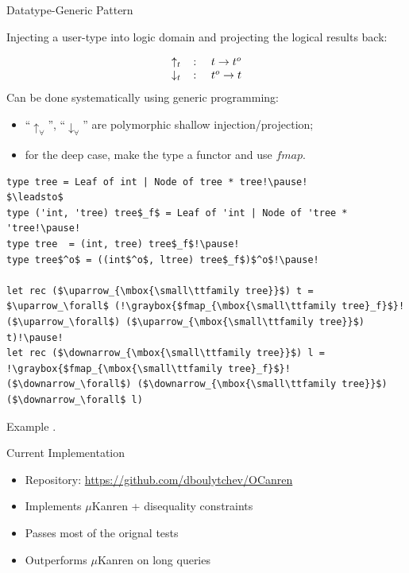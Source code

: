 \documentclass[10pt, mathserif]{beamer}
\let\\\tabularnewline
\let\\\tabularnewline
\newcommand{\oo}[1]{{#1}^o}
\newcommand{\graybox}[1]{\colorbox{light-gray}{#1}}
\theoremstyle{definition}
\begin{document}
\begin{frame}[fragile]{Datatype-Generic Pattern}

\small
Injecting a user-type into logic domain and projecting the
logical results back:

$$
\begin{array}{rcl}
\uparrow_t&\colon &t \to \oo{t}\\
\downarrow_t&\colon& \oo{t} \to t
\end{array}
$$
\pause
Can be done systematically using generic programming:

\begin{itemize}
\item ``$\uparrow_\forall$'', ``$\downarrow_\forall$'' are polymorphic shallow injection/projection;
\item for the deep case, make the type a functor and use $fmap$.
\end{itemize}
\pause
\begin{lstlisting}[mathescape=true]
type tree = Leaf of int | Node of tree * tree!\pause!
$\leadsto$
type ('int, 'tree) tree$_f$ = Leaf of 'int | Node of 'tree * 'tree!\pause!
type tree  = (int, tree) tree$_f$!\pause!
type tree$^o$ = ((int$^o$, ltree) tree$_f$)$^o$!\pause!

let rec ($\uparrow_{\mbox{\small\ttfamily tree}}$) t = $\uparrow_\forall$ (!\graybox{$fmap_{\mbox{\small\ttfamily tree}_f}$}! ($\uparrow_\forall$) ($\uparrow_{\mbox{\small\ttfamily tree}}$) t)!\pause! 
let rec ($\downarrow_{\mbox{\small\ttfamily tree}}$) l = !\graybox{$fmap_{\mbox{\small\ttfamily tree}_f}$}! ($\downarrow_\forall$) ($\downarrow_{\mbox{\small\ttfamily tree}}$) ($\downarrow_\forall$ l) 

\end{lstlisting}
\end{frame}

\begin{frame}[fragile]{Example}
.
\end{frame}

\begin{frame}[fragile]{Current Implementation}
\begin{itemize}
\item Repository: \url{https://github.com/dboulytchev/OCanren}
\item Implements $\mu$Kanren + disequality constraints
\item Passes most of the orignal tests
\item Outperforms $\mu$Kanren on long queries
\end{itemize}

\end{frame}
\end{document}
